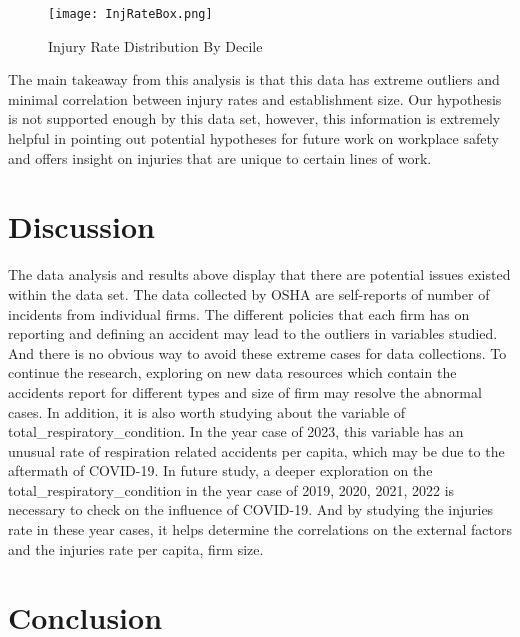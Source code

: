 \documentclass[12pt]{article}
\begin{document}
\begin{figure}
    \centering
    \texttt{[image: InjRateBox.png]}
    \caption{Injury Rate Distribution By Decile}
    \label{fig:enter-label}
\end{figure}

The main takeaway from this analysis is that this data has extreme outliers and minimal correlation between injury rates and establishment size. Our hypothesis is not supported enough by this data set, however, this information is extremely helpful in pointing out potential hypotheses for future work on workplace safety and offers insight on injuries that are unique to certain lines of work.  



\section{Discussion}
\label{sec:discussion}

    The data analysis and results above display that there are potential issues existed within the data set. The data collected by OSHA are self-reports of number of incidents from individual firms. The different policies that each firm has on reporting and defining an accident may lead to the outliers in variables studied. And there is no obvious way to avoid these extreme cases for data collections. To continue the research, exploring on new data resources which contain the accidents report for different types and size of firm may resolve the abnormal cases. In addition, it is also worth studying about the variable of total\_respiratory\_condition. In the year case of 2023, this variable has an unusual rate of respiration related accidents per capita, which may be due to the aftermath of COVID-19. In future study, a deeper exploration on the total\_respiratory\_condition in the year case of 2019, 2020, 2021, 2022 is necessary to check on the influence of COVID-19. And by studying the injuries rate in these year cases, it helps determine the correlations on the external factors and the injuries rate per capita, firm size.


\section{Conclusion}
\label{sec:conclusion}
\end{document}
